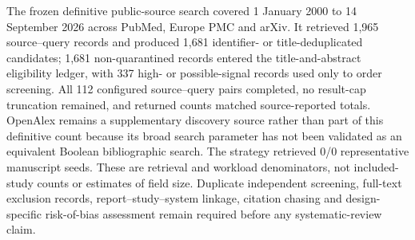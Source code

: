 The frozen definitive public-source search covered 1 January 2000 to 14 September 2026 across PubMed, Europe PMC and arXiv. It retrieved 1,965 source--query records and produced 1,681 identifier- or title-deduplicated candidates; 1,681 non-quarantined records entered the title-and-abstract eligibility ledger, with 337 high- or possible-signal records used only to order screening. All 112 configured source--query pairs completed, no result-cap truncation remained, and returned counts matched source-reported totals. OpenAlex remains a supplementary discovery source rather than part of this definitive count because its broad search parameter has not been validated as an equivalent Boolean bibliographic search. The strategy retrieved 0/0 representative manuscript seeds. These are retrieval and workload denominators, not included-study counts or estimates of field size. Duplicate independent screening, full-text exclusion records, report--study--system linkage, citation chasing and design-specific risk-of-bias assessment remain required before any systematic-review claim.
